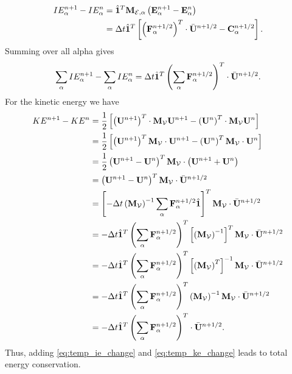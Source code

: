 \documentclass[11pt]{report}
\begin{document}
\begin{align*}
    IE^{n+1}_\alpha - IE^n_\alpha &= \hat{\mathbf{1}}^T \mathbf{M}_{\mathcal{E},\alpha} \left( \mathbf{E}^{n+1}_\alpha - \mathbf{E}^n_\alpha \right) \nonumber \\
    &= \Delta t \hat{\mathbf{1}}^T \left[ \left( \mathbf{F}^{n+1/2}_\alpha \right)^T \cdot \bar{\mathbf{U}}^{n+1/2} - \mathbf{C}^{n+1/2}_\alpha \right].
\end{align*}
Summing over all alpha gives
\begin{equation}
    \label{eq:temp_ie_change}
    \sum_\alpha IE^{n+1}_\alpha - \sum_\alpha IE^n_\alpha = \Delta t \hat{\mathbf{1}}^T \left( \sum_\alpha \mathbf{F}^{n+1/2}_\alpha \right)^T \cdot \bar{\mathbf{U}}^{n+1/2}.
\end{equation}
For the kinetic energy we have
\begin{align}
    \label{eq:temp_ke_change}
    KE^{n+1} - KE^n &= \frac{1}{2} \left[ \left( \mathbf{U}^{n+1} \right)^T \cdot \mathbf{M}_\mathcal{V} \mathbf{U}^{n+1} - \left( \mathbf{U}^n \right)^T \cdot \mathbf{M}_\mathcal{V} \mathbf{U}^n \right] \nonumber \\
    &= \frac{1}{2} \left[ \left( \mathbf{U}^{n+1} \right)^T \mathbf{M}_\mathcal{V} \cdot \mathbf{U}^{n+1} - \left( \mathbf{U}^n \right)^T \mathbf{M}_\mathcal{V} \cdot \mathbf{U}^n \right] \nonumber \\
    &= \frac{1}{2} \left( \mathbf{U}^{n+1} - \mathbf{U}^n \right)^T \mathbf{M}_\mathcal{V} \cdot \left( \mathbf{U}^{n+1} + \mathbf{U}^n \right) \nonumber \\ 
    &= \left( \mathbf{U}^{n+1} - \mathbf{U}^n \right)^T \mathbf{M}_\mathcal{V} \cdot \bar{\mathbf{U}}^{n+1/2} \nonumber \\
    &= \left[ - \Delta t \left( \mathbf{M}_\mathcal{V} \right)^{-1} \sum_\alpha \mathbf{F}^{n+1/2}_\alpha \hat{\mathbf{1}} \right]^T \mathbf{M}_\mathcal{V} \cdot \bar{\mathbf{U}}^{n+1/2} \nonumber \\
    &= -\Delta t \hat{\mathbf{1}}^T \left( \sum_\alpha \mathbf{F}^{n+1/2}_\alpha \right)^T \left[ \left( \mathbf{M}_\mathcal{V} \right)^{-1} \right]^T \mathbf{M}_\mathcal{V} \cdot \bar{\mathbf{U}}^{n+1/2} \nonumber \\
    &= -\Delta t \hat{\mathbf{1}}^T \left( \sum_\alpha \mathbf{F}^{n+1/2}_\alpha \right)^T \left[ \left( \mathbf{M}_\mathcal{V} \right)^T \right]^{-1} \mathbf{M}_\mathcal{V} \cdot \bar{\mathbf{U}}^{n+1/2} \nonumber \\
    &= -\Delta t \hat{\mathbf{1}}^T \left( \sum_\alpha \mathbf{F}^{n+1/2}_\alpha \right)^T \left( \mathbf{M}_\mathcal{V} \right)^{-1} \mathbf{M}_\mathcal{V} \cdot \bar{\mathbf{U}}^{n+1/2} \nonumber \\
    &= -\Delta t \hat{\mathbf{1}}^T \left( \sum_\alpha \mathbf{F}^{n+1/2}_\alpha \right)^T \cdot \bar{\mathbf{U}}^{n+1/2}.
\end{align}
Thus, adding \cref{eq:temp_ie_change} and \cref{eq:temp_ke_change} leads to total energy conservation.
\end{document}
